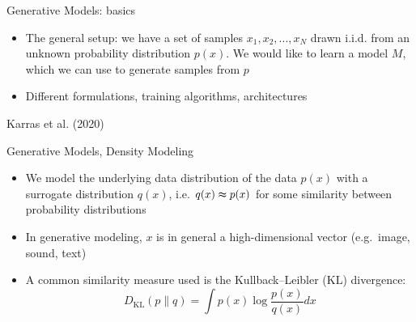 \begin{frame}{Generative Models: basics}
\protect\hypertarget{generative-models-basics}{}

\begin{itemize}
\tightlist
\item
  The general setup: we have a set of samples \(x_1,x_2,...,x_N\) drawn
  i.i.d. from an unknown probability distribution \(p(x)\). We would
  like to learn a model \(M\), which we can use to generate samples from
  \(p\)
\item
  Different formulations, training algorithms, architectures
\end{itemize}


Karras et al. (2020)

\end{frame}

\begin{frame}{Generative Models, Density Modeling}
\protect\hypertarget{generative-models-density-modeling}{}

\begin{itemize}
\tightlist
\item
  We model the underlying data distribution of the data \(p(x)\) with a
  surrogate distribution \(q(x)\), i.e. \(q(x) \thickapprox p(x)\) for
  some similarity between probability distributions
\item
  In generative modeling, \(x\) is in general a high-dimensional vector
  (e.g.~image, sound, text)
\item
  A common similarity measure used is the Kullback--Leibler
  (\(\text{KL}\)) divergence:
  \[ D_{\text{KL}} (p \parallel q) = \int p(x)\log\frac{p(x)}{q(x)}dx \]
\end{itemize}

\end{frame}


